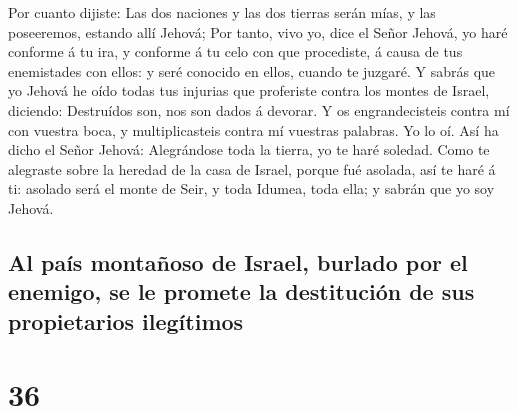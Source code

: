  Por cuanto dijiste: Las dos naciones y las dos tierras
serán mías, y las poseeremos, estando allí Jehová;  Por
tanto, vivo yo, dice el Señor Jehová, yo haré conforme á tu ira, y
conforme á tu celo con que procediste, á causa de tus enemistades con
ellos: y seré conocido en ellos, cuando te juzgaré.  Y
sabrás que yo Jehová he oído todas tus injurias que proferiste contra
los montes de Israel, diciendo: Destruídos son, nos son dados á devorar.
 Y os engrandecisteis contra mí con vuestra boca, y
multiplicasteis contra mí vuestras palabras. Yo lo oí.  Así
ha dicho el Señor Jehová: Alegrándose toda la tierra, yo te haré
soledad.  Como te alegraste sobre la heredad de la casa de
Israel, porque fué asolada, así te haré á ti: asolado será el monte de
Seir, y toda Idumea, toda ella; y sabrán que yo soy Jehová.

\hypertarget{al-pauxeds-montauxf1oso-de-israel-burlado-por-el-enemigo-se-le-promete-la-destituciuxf3n-de-sus-propietarios-ileguxedtimos}{%
\subsection{Al país montañoso de Israel, burlado por el enemigo, se le
promete la destitución de sus propietarios
ilegítimos}\label{al-pauxeds-montauxf1oso-de-israel-burlado-por-el-enemigo-se-le-promete-la-destituciuxf3n-de-sus-propietarios-ileguxedtimos}}

\hypertarget{section-35}{%
\section{36}\label{section-35}}

